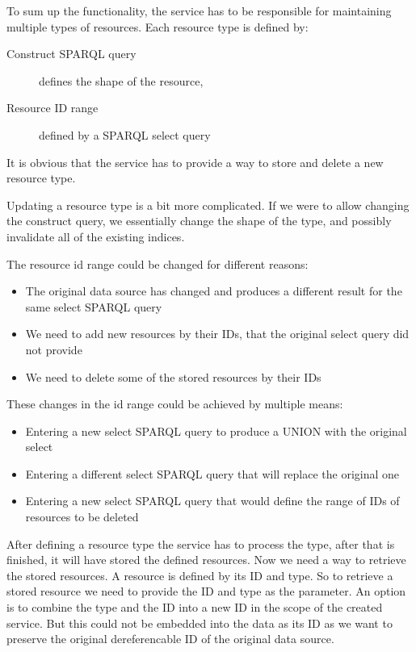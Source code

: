 To sum up the functionality, the service has to be responsible for maintaining multiple types of resources.
Each resource type is defined by:
\begin{description}
	\item[Construct SPARQL query] defines the shape of the resource, 
	\item[Resource ID range] defined by a SPARQL select query
\end{description}
It is obvious that the service has to provide a way to store and delete a new resource type. 

Updating a resource type is a bit more complicated. If we were to allow changing the construct query, we essentially change the shape of the type, and possibly invalidate all of the existing indices. 

The resource id range could be changed for different reasons:
\begin{itemize}
	\item The original data source has changed and produces a different result for the same select SPARQL query
	\item We need to add new resources by their IDs, that the original select query did not provide
	\item We need to delete some of the stored resources by their IDs
\end{itemize}
These changes in the id range could be achieved by multiple means: 
\begin{itemize}
	\item Entering a new select SPARQL query to produce a UNION with the original select
	\item Entering a different select SPARQL query that will replace the original one
	\item Entering a new select SPARQL query that would define the range of IDs of resources to be deleted
\end{itemize}

After defining a resource type the service has to process the type, after that is finished, it will have stored the defined resources. Now we need a way to retrieve the stored resources. A resource is defined by its ID and type. So to retrieve a stored resource we need to provide the ID and type as the parameter.
An option is to combine the type and the ID into a new ID in the scope of the created service. But this could not be embedded into the data as its ID as we want to preserve the original dereferencable ID of the original data source.


